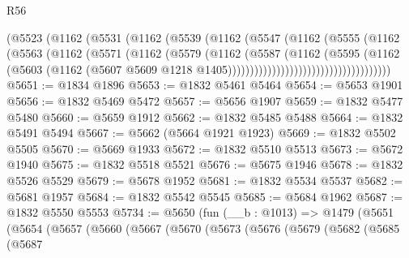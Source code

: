 \begin{lexlean}{R56}
\begin{coremodule}
                                (@5523
                                  (@1162
                                    (@5531
                                      (@1162
                                        (@5539
                                          (@1162
                                            (@5547
                                              (@1162
                                                (@5555
                                                  (@1162
                                                    (@5563
                                                      (@1162
                                                        (@5571
                                                          (@1162
                                                            (@5579
                                                              (@1162
                                                                (@5587
                                                                  (@1162
                                                                    (@5595
                                                                      (@1162
                                                                        (@5603
                                                                          (@1162
                                                                            (@5607
                                                                              @5609
                                                                              @1218
                                                                              @1405)))))))))))))))))))))))))))))))))))))
@5651 := @1834 @1896
@5653 := @1832 @5461 @5464
@5654 := @5653 @1901
@5656 := @1832 @5469 @5472
@5657 := @5656 @1907
@5659 := @1832 @5477 @5480
@5660 := @5659 @1912
@5662 := @1832 @5485 @5488
@5664 := @1832 @5491 @5494
@5667 := @5662 (@5664 @1921 @1923)
@5669 := @1832 @5502 @5505
@5670 := @5669 @1933
@5672 := @1832 @5510 @5513
@5673 := @5672 @1940
@5675 := @1832 @5518 @5521
@5676 := @5675 @1946
@5678 := @1832 @5526 @5529
@5679 := @5678 @1952
@5681 := @1832 @5534 @5537
@5682 := @5681 @1957
@5684 := @1832 @5542 @5545
@5685 := @5684 @1962
@5687 := @1832 @5550 @5553
@5734 := @5650
    (fun (__b : @1013) =>
    @1479
      (@5651
        (@5654
          (@5657
            (@5660
              (@5667
                (@5670
                  (@5673
                    (@5676
                      (@5679
                        (@5682
                          (@5685
                            (@5687

\end{coremodule}
\end{lexlean}
